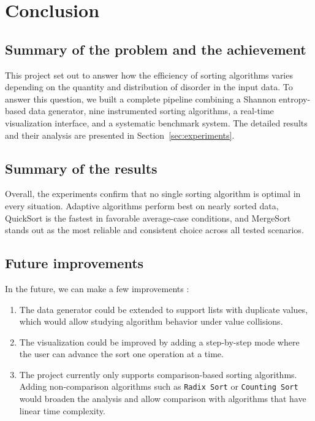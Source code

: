 \documentclass{article}
\begin{document}
\section{Conclusion}

\subsection{Summary of the problem and the achievement} 
This project set out to answer how the efficiency of sorting algorithms 
varies depending on the quantity and distribution of disorder in the 
input data. To answer this question, we built a complete pipeline 
combining a Shannon entropy-based data generator, nine instrumented 
sorting algorithms, a real-time visualization interface, and a 
systematic benchmark system. The detailed results and their analysis 
are presented in Section~\ref{sec:experiments}.

\subsection{Summary of the results}

Overall, the experiments confirm that no single sorting algorithm is optimal in every situation. Adaptive algorithms perform best on nearly sorted data, QuickSort is the fastest in favorable average-case conditions, and MergeSort stands out as the most reliable and consistent choice across all tested scenarios.

\subsection{Future improvements}

In the future, we can make a few improvements :
\begin{enumerate}
    \item The data generator could be extended to support lists with duplicate values, which would allow studying algorithm behavior under value collisions.
    
    \item The visualization could be improved by adding a step-by-step mode where the user can advance the sort one operation at a time.
    
    \item The project currently only supports comparison-based sorting algorithms. Adding non-comparison algorithms such as \texttt{Radix Sort} or \texttt{Counting Sort} would broaden the analysis and allow comparison with algorithms that have linear time complexity.
\end{enumerate}
\end{document}
